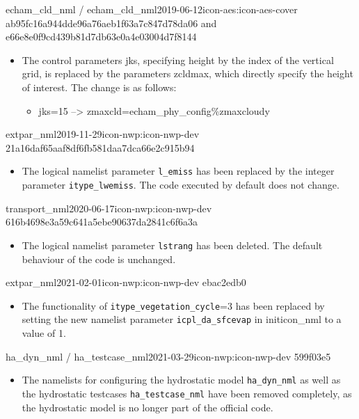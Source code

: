 \begin{changeitem}{echam\_cld\_nml / echam\_cld\_nml}{2019-06-12}{icon-aes:icon-aes-cover ab95fc16a944dde96a76aeb1f63a7c847d78da06 and e66e8e0f9cd439b81d7db63e0a4e03004d7f8144}
  \begin{itemize}
   \item The control parameters jks, specifying height by the index of the vertical grid, is replaced by the parameters zcldmax, which directly specify the height of interest. The change is as follows: \newline
   \begin{itemize}
    \item jks=15 --> zmaxcld=echam\_phy\_config\%zmaxcloudy
   \end{itemize}
  \end{itemize}
\end{changeitem}

\begin{changeitem}{extpar\_nml}{2019-11-29}{icon-nwp:icon-nwp-dev 21a16daf65aaf8df6fb581daa7dca66e2c915b94}
  \begin{itemize}
   \item The logical namelist parameter \texttt{l\_emiss} has been replaced by the integer parameter \texttt{itype\_lwemiss}.
     The code executed by default does not change.
  \end{itemize}
\end{changeitem}

\begin{changeitem}{transport\_nml}{2020-06-17}{icon-nwp:icon-nwp-dev 616b4698e3a59c641a5ebe90637da2841c6f6a3a}
  \begin{itemize}
   \item The logical namelist parameter \texttt{lstrang} has been deleted. The default behaviour of the code is unchanged.
  \end{itemize}
\end{changeitem}

\begin{changeitem}{extpar\_nml}{2021-02-01}{icon-nwp:icon-nwp-dev ebac2edb0}
  \begin{itemize}
   \item The functionality of \texttt{itype\_vegetation\_cycle}=3 has been replaced by setting the new namelist parameter \texttt{icpl\_da\_sfcevap}
    in initicon\_nml to a value of 1.
  \end{itemize}
\end{changeitem}

\begin{changeitem}{ha\_dyn\_nml / ha\_testcase\_nml}{2021-03-29}{icon-nwp:icon-nwp-dev 599f03e5}
  \begin{itemize}
   \item The namelists for configuring the hydrostatic model \texttt{ha\_dyn\_nml} as well as the hydrostatic testcases
   \texttt{ha\_testcase\_nml} have been removed completely, as the hydrostatic model is no longer part of the official code.
  \end{itemize}
\end{changeitem}

